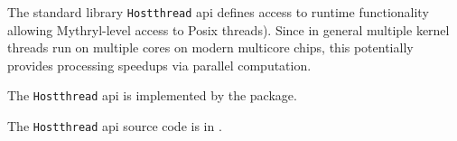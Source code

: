 
The standard library {\tt Hostthread} api defines access to runtime functionality allowing 
Mythryl-level access to Posix threads).  Since in 
general multiple kernel threads run on multiple cores on modern multicore chips, this 
potentially provides processing speedups via parallel computation. 

The {\tt Hostthread} api is implemented by the  package.

The {\tt Hostthread} api source code is in .


